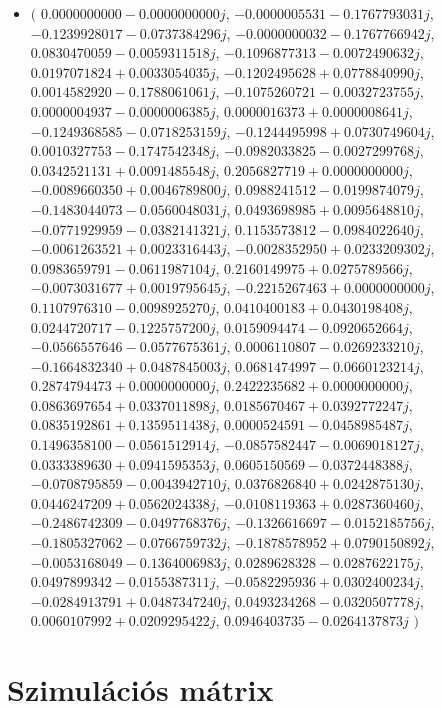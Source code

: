 \documentclass[14pt,a4paper]{article}
\begin{document}
\begin{itemize}
\item
$\big($
$0.0000000000-0.0000000000j$, $-0.0000005531-0.1767793031j$, $-0.1239928017-0.0737384296j$, $-0.0000000032-0.1767766942j$, $0.0830470059-0.0059311518j$, $-0.1096877313-0.0072490632j$, $0.0197071824+0.0033054035j$, $-0.1202495628+0.0778840990j$, $0.0014582920-0.1788061061j$, $-0.1075260721-0.0032723755j$, $0.0000004937-0.0000006385j$, $0.0000016373+0.0000008641j$, $-0.1249368585-0.0718253159j$, $-0.1244495998+0.0730749604j$, $0.0010327753-0.1747542348j$, $-0.0982033825-0.0027299768j$, $0.0342521131+0.0091485548j$, $0.2056827719+0.0000000000j$, $-0.0089660350+0.0046789800j$, $0.0988241512-0.0199874079j$, $-0.1483044073-0.0560048031j$, $0.0493698985+0.0095648810j$, $-0.0771929959-0.0382141321j$, $0.1153573812-0.0984022640j$, $-0.0061263521+0.0023316443j$, $-0.0028352950+0.0233209302j$, $0.0983659791-0.0611987104j$, $0.2160149975+0.0275789566j$, $-0.0073031677+0.0019795645j$, $-0.2215267463+0.0000000000j$, $0.1107976310-0.0098925270j$, $0.0410400183+0.0430198408j$, $0.0244720717-0.1225757200j$, $0.0159094474-0.0920652664j$, $-0.0566557646-0.0577675361j$, $0.0006110807-0.0269233210j$, $-0.1664832340+0.0487845003j$, $0.0681474997-0.0660123214j$, $0.2874794473+0.0000000000j$, $0.2422235682+0.0000000000j$, $0.0863697654+0.0337011898j$, $0.0185670467+0.0392772247j$, $0.0835192861+0.1359511438j$, $0.0000524591-0.0458985487j$, $0.1496358100-0.0561512914j$, $-0.0857582447-0.0069018127j$, $0.0333389630+0.0941595353j$, $0.0605150569-0.0372448388j$, $-0.0708795859-0.0043942710j$, $0.0376826840+0.0242875130j$, $0.0446247209+0.0562024338j$, $-0.0108119363+0.0287360460j$, $-0.2486742309-0.0497768376j$, $-0.1326616697-0.0152185756j$, $-0.1805327062-0.0766759732j$, $-0.1878578952+0.0790150892j$, $-0.0053168049-0.1364006983j$, $0.0289628328-0.0287622175j$, $0.0497899342-0.0155387311j$, $-0.0582295936+0.0302400234j$, $-0.0284913791+0.0487347240j$, $0.0493234268-0.0320507778j$, $0.0060107992+0.0209295422j$, $0.0946403735-0.0264137873j$
$\big)$
\end{itemize}
\section{Szimulációs mátrix}
\end{document}
